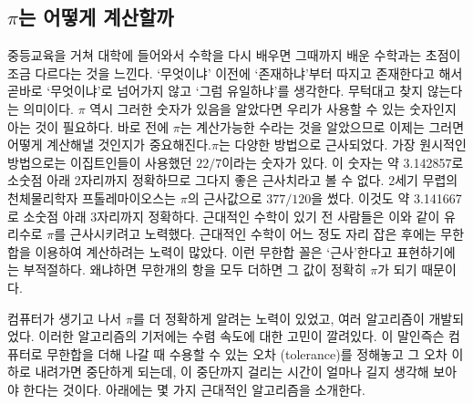 \documentclass[10pt]{article}
\begin{document}
\subsection{$\pi$는 어떻게 계산할까}
중등교육을 거쳐 대학에 들어와서 수학을 다시 배우면 그때까지 배운 수학과는 초점이 조금 다르다는 것을 느낀다. `무엇이냐' 이전에 `존재하냐'부터 따지고 존재한다고 해서 곧바로 `무엇이냐'로 넘어가지 않고 `그럼 유일하냐'를 생각한다. 무턱대고 찾지 않는다는 의미이다. $\pi$ 역시 그러한 숫자가 있음을 알았다면 우리가 사용할 수 있는 숫자인지 아는 것이 필요하다. 바로 전에 $\pi$는 계산가능한 수라는 것을 알았으므로 이제는 그러면 어떻게 계산해낼 것인지가 중요해진다. $\pi$는 다양한 방법으로 근사되었다. 가장 원시적인 방법으로는 이집트인들이 사용했던 $22/7$이라는 숫자가 있다. 이 숫자는 약 3.142857로 소숫점 아래 2자리까지 정확하므로 그다지 좋은 근사치라고 볼 수 없다. 2세기 무렵의 천체물리학자 프톨레마이오스는 $\pi$의 근사값으로 $377/120$을 썼다. 이것도 약 3.141667로 소숫점 아래 3자리까지 정확하다. 근대적인 수학이 있기 전 사람들은 이와 같이 유리수로 $\pi$를 근사시키려고 노력했다. 근대적인 수학이 어느 정도 자리 잡은 후에는 무한합을 이용하여 계산하려는 노력이 많았다. 이런 무한합 꼴은 `근사'한다고 표현하기에는 부적절하다. 왜냐하면 무한개의 항을 모두 더하면 그 값이 정확히 $\pi$가 되기 때문이다. \par
컴퓨터가 생기고 나서 $\pi$를 더 정확하게 알려는 노력이 있었고, 여러 알고리즘이 개발되었다. 이러한 알고리즘의 기저에는 수렴 속도에 대한 고민이 깔려있다. 이 말인즉슨 컴퓨터로 무한합을 더해 나갈 때 수용할 수 있는 오차 (tolerance)를 정해놓고 그 오차 이하로 내려가면 중단하게 되는데, 이 중단까지 걸리는 시간이 얼마나 길지 생각해 보아야 한다는 것이다. 아래에는 몇 가지 근대적인 알고리즘을 소개한다.
\end{document}
